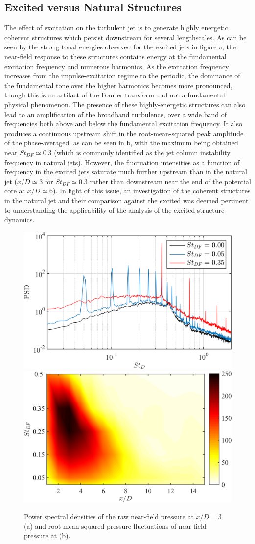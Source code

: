 \subsection{Excited versus Natural Structures}
The effect of excitation on the turbulent jet is to generate highly energetic coherent structures which persist downstream for several lengthscales.
As can be seen by the strong tonal energies observed for the excited jets in figure a, the near-field response to these structures contains energy at the fundamental excitation frequency and numerous harmonics. %
As the excitation frequency increases from the impulse-excitation regime to the periodic, the dominance of the fundamental tone over the higher harmonics becomes more pronounced, though this is an artifact of the Fourier transform and not a fundamental physical phenomenon. 
The presence of these highly-energetic structures can also lead to an amplification of the broadband turbulence, over a wide band of frequencies both above and below the fundamental excitation frequency.
It also produces a continuous upstream shift in the root-mean-squared peak amplitude of the phase-averaged, as can be seen in b, with the maximum being obtained near $St_{DF} \simeq 0.3$ (which is commonly identified as the jet column instability frequency in natural jets).
However, the fluctuation intensities as a function of frequency in the excited jets saturate much further upstream than in the natural jet ($x/D \simeq 3$ for $St_{DF} \simeq 0.3$ rather than downstream near the end of the potential core at $x/D \simeq 6$).
In light of this issue, an investigation of the coherent structures in the natural jet and their comparison against the excited was deemed pertinent to understanding the applicability of the analysis of the excited structure dynamics.
\begin{figure}
	\centering
	\includegraphics[width=0.44\linewidth]{Figures/sect_nearfield_spectra.png}
	\includegraphics[width=0.46\linewidth]{Figures/sect_nearfield_prms.png}
	\caption{Power spectral densities of the raw near-field pressure at $x/D = 3$ (a) and root-mean-squared pressure fluctuations of near-field pressure at (b).}
	\label{fig:sect_nearfield_spectra_prms}
\end{figure}

